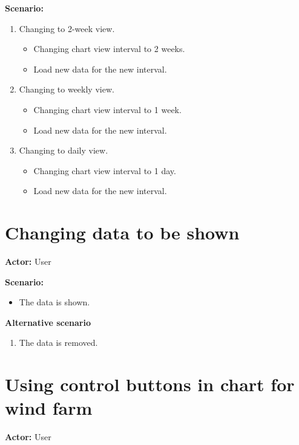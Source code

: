 \textbf{Scenario:}
\begin{enumerate}
\item Changing to 2-week view.
\begin{itemize}
\item Changing chart view interval to 2 weeks.
\item Load new data for the new interval.
\end{itemize}
\item Changing to weekly view.
\begin{itemize}
\item Changing chart view interval to 1 week.
\item Load new data for the new interval.
\end{itemize}
\item Changing to daily view.
\begin{itemize}
\item Changing chart view interval to 1 day.
\item Load new data for the new interval.
\end{itemize}
\end{enumerate}

\section{Changing data to be shown}
\textbf{Actor:} User

\textbf{Scenario:}
\begin{itemize}
\item The data is shown.
\end{itemize}
\textbf{Alternative scenario}
\begin{enumerate}
\item The data is removed.
\end{enumerate}

\section{Using control buttons in chart for wind farm}
\textbf{Actor:} User

